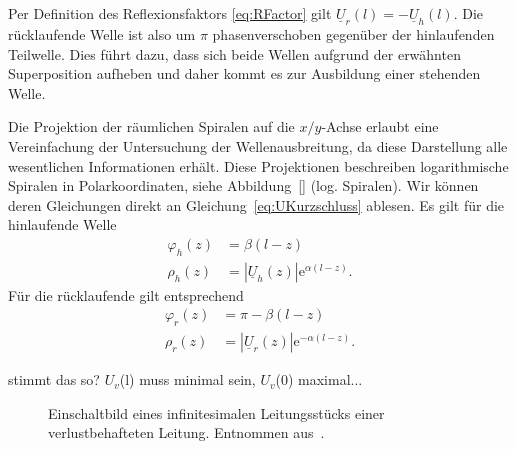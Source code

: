 \documentclass[paper=a4, parskip=half-, ngerman, fontsize=11pt]{scrreprt}
\begin{document}
Per Definition des Reflexionsfaktors \eqref{eq:RFactor} gilt $\underline{U}_{r}(l) = - \underline{U}_{h}(l)$. Die
rücklaufende Welle ist also um $\pi$ phasenverschoben gegenüber der hinlaufenden Teilwelle. Dies führt dazu, dass sich
beide Wellen aufgrund der erwähnten Superposition aufheben und daher kommt es zur Ausbildung einer stehenden Welle.

Die Projektion der räumlichen Spiralen auf die $x/y$-Achse erlaubt eine Vereinfachung der Untersuchung der
Wellenausbreitung, da diese Darstellung alle wesentlichen Informationen erhält. Diese Projektionen beschreiben
logarithmische Spiralen in Polarkoordinaten, siehe Abbildung~\ref{} (log. Spiralen).
Wir können deren Gleichungen direkt an Gleichung~\eqref{eq:UKurzschluss} ablesen. Es gilt für die hinlaufende Welle
\begin{align}
    \varphi_{h}(z) &= \beta (l - z) \\[1ex]
    \rho_{h}(z) &= \left| \underline{U}_{h}(z) \right| \mathrm{e}^{\alpha (l - z)}.
\end{align}
Für die rücklaufende gilt entsprechend
\begin{align}
    \varphi_{r}(z) &= \pi - \beta (l - z) \\[1ex]
    \rho_{r}(z) &= \left| \underline{U}_{r}(z) \right| \mathrm{e}^{- \alpha (l - z)}.
\end{align}

{\color{red} stimmt das so? $U_v$(l) muss minimal sein, $U_v$(0) maximal...}


\begin{figure}[!htpb]
    \begin{center}
        
        \caption{Einschaltbild eines infinitesimalen Leitungsstücks einer verlustbehafteten Leitung. Entnommen
            aus~\cite{LeitungenUndFilter}.}
        \label{Spirale}
    \end{center}
\end{figure}



\appendix
\end{document}
